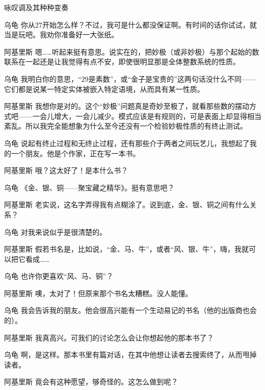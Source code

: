 \begin{dialog}{咏叹调及其种种变奏}
\begin{dialogue}
\item[乌龟]你从$27$开始怎么样？不过，我可是什么都没保证啊。有时间的话你试试，就当是玩吧。我劝你准备好一大张纸。

\item[阿基里斯]嗯……听起来挺有意思。说实在的，把妙极（或非妙极）与那个起始的数联系在一起还是让我觉得有点不安，即使很明显那是全体整数系统的性质。

\item[乌龟]我明白你的意思，“$29$是素数”，或“金子是宝贵的”这两句话没什么不同——它们都是说某一特定实体被嵌入特定语境，从而具有某一性质。

\item[阿基里斯]我想你是对的。这个“妙极”问题真是奇妙至极了，就看那些数的摆动方式吧——一会儿增大，一会儿减少。模式应该是有规则的，可是表面上却显得相当紊乱。所以我完全能想象为什么至今还没有一个检验妙极性质的有终止测试。

\item[乌龟]说起有终止过程和无终止过程，还有那些介于两者之间玩艺儿，我想起了我的一个朋友。他是个作家，正在写一本书。

\item[阿基里斯]哦？这太好了！是本什么书？

\item[乌龟]《金、银、铜——聚宝藏之精华》。挺有意思吧？

\item[阿基里斯]老实说，这名字弄得我有点糊涂了。说到底，金、银、铜之间有什么关系？

\item[乌龟]对我来说似乎是很清楚的。

\item[阿基里斯]假若书名是，比如说，“金、马、牛”，或者“风、银、牛”，嗨，我就可以把它看成……

\item[乌龟]也许你更喜欢“风、马、铜”？

\item[阿基里斯]噢，太对了！但原来那个书名太糟糕。没人能懂。

\item[乌龟]我会告诉我的朋友。他会很高兴能有一个生动易记的书名（他的出版商也会的）。

\item[阿基里斯]我真高兴。可我们的讨论怎么会让你想起他的那本书了？

\item[乌龟]啊，是这样。那本书里有篇对话，在其中他想让读者去搜索终了，从而甩掉读者。

\item[阿基里斯]竟会有这种愿望，够奇怪的。这怎么做到呢？


\end{dialogue}
\end{dialog}
